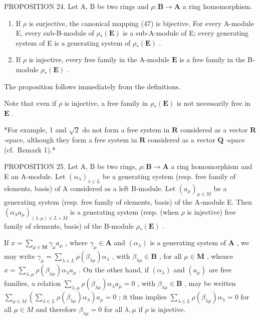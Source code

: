 PROPOSITION 24. Let A, B be two rings and \(\rho: \mathbf{B} \to \mathbf{A}\) a ring homomorphism.

\begin{enumerate}
\def\labelenumi{(\roman{enumi})}
\item
  If \(\rho\) is surjective, the canonical mapping (47) is bijective. For every A-module E, every sub-B-module of \(\rho_{*}(\mathbf{E})\) is a sub-A-module of E; every generating system of E is a generating system of \(\rho_{*}(\mathbf{E})\) .
\item
  If \(\rho\) is injective, every free family in the A-module \(\mathbf{E}\) is a free family in the B-module \(\rho_{*}(\mathbf{E})\) .
\end{enumerate}

The proposition follows immediately from the definitions.

Note that even if \(\rho\) is injective, a free family in \(\rho_{*}(\mathbf{E})\) is not necessarily free in \(\mathbf{E}\) .

*For example, 1 and \(\sqrt{2}\) do not form a free system in \(\mathbf{R}\) considered as a vector \(\mathbf{R}\) -space, although they form a free system in \(\mathbf{R}\) considered as a vector \(\mathbf{Q}\) -space (cf.~Remark 1).*

PROPOSITION 25. Let A, B be two rings, \(\rho: \mathbf{B} \to \mathbf{A}\) a ring homomorphism and E an A-module. Let \((\alpha_{\lambda})_{\lambda \in L}\) be a generating system (resp. free family of elements, basis) of A considered as a left B-module. Let \((a_{\mu})_{\mu \in M}\) be a generating system (resp. free family of elements, basis) of the A-module E. Then \((\alpha_{\lambda}a_{\mu})_{(\lambda,\mu) \in L \times M}\) is a generating system (resp. (when \(\rho\) is injective) free family of elements, basis) of the B-module \(\rho_{*}(\mathbf{E})\) .

If \(x = \sum_{\mu \in \mathbf{M}} \gamma_{\mu} a_{\mu}\) , where \(\gamma_{\mu} \in \mathbf{A}\) and \((\alpha_{\lambda})\) is a generating system of \(\mathbf{A}\) , we may write \(\gamma_{\mu} = \sum_{\lambda \in L} \rho(\beta_{\lambda \mu}) \alpha_{\lambda}\) , with \(\beta_{\lambda \mu} \in \mathbf{B}\) , for all \(\mu \in \mathbf{M}\) , whence \(x = \sum_{\lambda, \mu} \rho(\beta_{\lambda \mu}) \alpha_{\lambda} a_{\mu}\) . On the other hand, if \((\alpha_{\lambda})\) and \((a_{\mu})\) are free families, a relation \(\sum_{\lambda, \mu} \rho(\beta_{\lambda \mu}) \alpha_{\lambda} a_{\mu} = 0\) , with \(\beta_{\lambda \mu} \in \mathbf{B}\) , may be written \(\sum_{\mu \in M} \left( \sum_{\lambda \in L} \rho(\beta_{\lambda \mu}) \alpha_{\lambda} \right) a_{\mu} = 0\) ; it thus implies \(\sum_{\lambda \in L} \rho(\beta_{\lambda \mu}) \alpha_{\lambda} = 0\) for all \(\mu \in M\) and therefore \(\beta_{\lambda \mu} = 0\) for all \(\lambda, \mu\) if \(\rho\) is injective.

